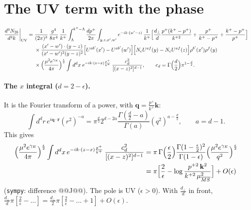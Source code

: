 \documentclass[10pt]{article}
\numberwithin{equation}{section}
\newcommand{\phx}{e^{-ik\cdot(z-x)\frac{p^{+}}{k^{+}}}}
\begin{document}
\section{The UV term with the phase}
\begin{align}
\frac{d^{3}N_{2b}}{d^{3}k}\bigg|_{\rm UV}={}&\frac{1}{(2\pi)^{3}}\,\frac{g^{4}}{8\pi^{4}}\,\frac{1}{k^{+}}\int_{\Lambda}^{k^{+}-\Lambda}\frac{dp^{+}}{2\pi}\int_{y,z,x',w'}e^{-ik\cdot(w'-z)}\,\frac{1}{k^+}\Big[\frac{d_\perp}{d}\frac{p^{+}(k^{+}-p^{+})}{k^{+2}}+\frac{p^{+}}{k^{+}-p^{+}}+\frac{k^{+}-p^{+}}{p^{+}}\Big]\notag\\
&\times\frac{(x'-w')\cdot(y-z)}{(x'-w')^{2}(y-z)^{2}}\Big[U^{ab'}(x')-U^{ab'}(w')\Big]\Big[N_cU^{af}(y)-N_cU^{af}(z)\Big]\rho^{b'}(x')\rho^{f}(y)\notag\\
&\times\Big(\frac{\mu^2e^{\gamma_E}}{4\pi}\Big)^{\frac\epsilon2}\int d^dx\;\phx\,\frac{c_d^2}{[(x-z)^2]^{d-1}},\qquad c_d=\Gamma\Big(\frac d2\Big)\pi^{1-\frac d2}.
\label{eq:UVx}
\end{align}
\paragraph{The $x$ integral ($d=2-\epsilon$).} It is the Fourier transform of a power, with $\mathbf q=\frac{p^+}{k^+}\mathbf k$:
\begin{equation}
\int d^dr\,e^{i\mathbf q\cdot\mathbf r}(r^2)^{-a}=\pi^{\frac d2}2^{d-2a}\frac{\Gamma(\frac d2-a)}{\Gamma(a)}(q^2)^{a-\frac d2},\qquad a=d-1 .
\end{equation}
This gives
\begin{align}
\Big(\frac{\mu^2e^{\gamma_E}}{4\pi}\Big)^{\frac\epsilon2}\int d^dx\,\phx\,\frac{c_d^2}{[(x-z)^2]^{d-1}}&=\pi\,\Gamma\Big(\frac\epsilon2\Big)\frac{\Gamma(1-\frac\epsilon2)^2}{\Gamma(1-\epsilon)}\Big(\frac{\mu^2e^{\gamma_E}}{q^2}\Big)^{\frac\epsilon2}\notag\\
&=\pi\Big[\frac{2}{\epsilon}-\log\frac{p^{+2}\,\mathbf k^2}{k^{+2}\,\mu^2_{\overline{MS}}}\Big]+O(\epsilon)
\label{eq:J}
\end{align}
(\texttt{sympy}: difference @@J@@). The pole is UV ($\epsilon>0$). With $\frac{d_\perp}{d}$ in front, $\frac{d_\perp}{d}\pi[\frac2\epsilon-\dots]=\frac{d_\perp}{2}\pi[\frac2\epsilon-\dots+1]+O(\epsilon)$.
\end{document}
